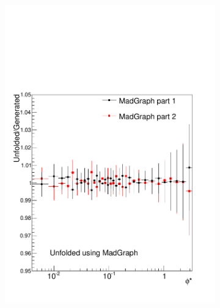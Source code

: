 \begin{figure}[!htbp]
    \centering
    \begin{subfigure}[b]{\SideBySidePlotWidth}
        \includegraphics[width=\textwidth]{figures/BinM_M1M2.pdf}
        \caption{}
        \label{fig:unfolding_madgraph_with_madgraph_halves}
    \end{subfigure}%
    \begin{subfigure}[b]{\SideBySidePlotWidth}

\end{subfigure}
\end{figure}
